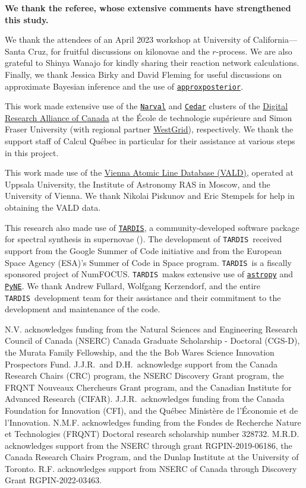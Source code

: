 \documentclass[twocolumn,twocolappendix]{aastex63}
\def\TARDIS{\texttt{TARDIS}}
\def\approxposterior{\texttt{approxposterior}}
\begin{document}
{{\textbf{We thank the referee, whose extensive comments have strengthened this study.}

We thank the attendees of an April 2023 workshop at University of California---Santa Cruz, for fruitful discussions on kilonovae and the $r$-process. We are also grateful to Shinya Wanajo for kindly sharing their reaction network calculations. Finally, we thank Jessica Birky and David Fleming for useful discussions on approximate Bayesian inference and the use of \href{https://dflemin3.github.io/approxposterior/index.html}{\approxposterior}.

This work made extensive use of the \href{https://docs.alliancecan.ca/wiki/Narval/en}{\texttt{Narval}} and \href{https://docs.alliancecan.ca/wiki/Cedar}{\texttt{Cedar}} clusters of the \href{https://alliancecan.ca/en}{Digital Research Alliance of Canada} at the {\'E}cole de technologie sup{\'e}rieure and Simon Fraser University (with regional partner \href{https://www.westgrid.ca/}{WestGrid}), respectively. We thank the support staff of Calcul Qu{\'e}bec in particular for their assistance at various steps in this project. 

This work made use of the \href{http://vald.astro.uu.se/~vald/php/vald.php}{Vienna Atomic Line Database (VALD)}, operated at Uppsala University, the Institute of Astronomy RAS in Moscow, and the University of Vienna. We thank Nikolai Piskunov and Eric Stempels for help in obtaining the VALD data.

This research also made use of \href{https://tardis-sn.github.io/tardis/index.html}{\TARDIS}, a community-developed software package for spectral synthesis in supernovae (\citealt{kerzendorf14}). The development of \TARDIS~received support from the Google Summer of Code initiative and from the European Space Agency (ESA)'s Summer of Code in Space program. \TARDIS~is a fiscally
sponsored project of NumFOCUS. \TARDIS~makes extensive use of \href{https://docs.astropy.org/en/stable/}{\texttt{astropy}} and \href{https://pyne.io/}{\texttt{PyNE}}. We thank Andrew Fullard, Wolfgang Kerzendorf, and the entire \TARDIS~development team for their assistance and their commitment to the development and maintenance of the code. 

N.V. acknowledges funding from the Natural Sciences and Engineering Research Council of Canada (NSERC) Canada Graduate Scholarship - Doctoral (CGS-D), the Murata Family Fellowship, and the the Bob Wares Science Innovation Prospectors Fund. J.J.R.\ and D.H.\ acknowledge support from the Canada Research Chairs (CRC) program, the NSERC Discovery Grant program, the FRQNT Nouveaux Chercheurs Grant program, and the Canadian Institute for Advanced Research (CIFAR). J.J.R.\ acknowledges funding from the Canada Foundation for Innovation (CFI), and the Qu\'{e}bec Ministère de l’\'{E}conomie et de l’Innovation. N.M.F. acknowledges funding from the Fondes de Recherche Nature et Technologies (FRQNT) Doctoral research scholarship number 328732. M.R.D. acknowledges support from the NSERC through grant RGPIN-2019-06186, the Canada Research Chairs Program, and the Dunlap Institute at the University of Toronto.
R.F. acknowledges support from NSERC of Canada through Discovery Grant RGPIN-2022-03463.
\newline

}}
\end{document}
